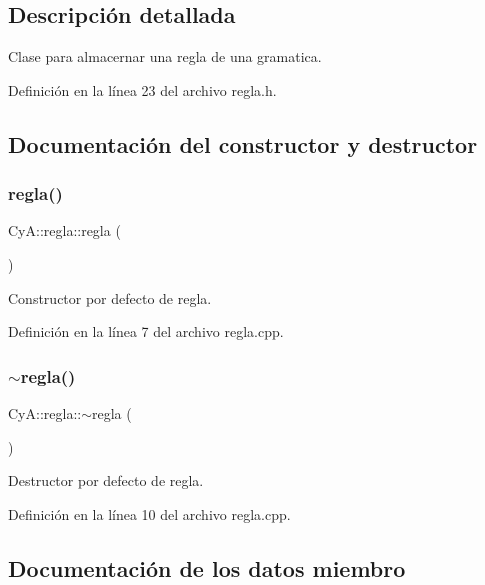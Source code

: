 \subsection{Descripción detallada}
Clase para almacernar una regla de una gramatica. 

Definición en la línea 23 del archivo regla.\+h.



\subsection{Documentación del constructor y destructor}
\mbox{\label{class_cy_a_1_1regla_aa5bc78631a7e4690fa64b393276876fb}} 
\subsubsection{\texorpdfstring{regla()}{regla()}}
{\footnotesize\ttfamily Cy\+A\+::regla\+::regla (\begin{DoxyParamCaption}{ }\end{DoxyParamCaption})}



Constructor por defecto de regla. 



Definición en la línea 7 del archivo regla.\+cpp.

\mbox{\label{class_cy_a_1_1regla_a67058ee1235792dc7b59dce849888349}} 
\subsubsection{\texorpdfstring{$\sim$regla()}{~regla()}}
{\footnotesize\ttfamily Cy\+A\+::regla\+::$\sim$regla (\begin{DoxyParamCaption}{ }\end{DoxyParamCaption})}



Destructor por defecto de regla. 



Definición en la línea 10 del archivo regla.\+cpp.



\subsection{Documentación de los datos miembro}
\mbox{\label{class_cy_a_1_1regla_a7bb5b7c78939e006e12a908799d36028}} 
